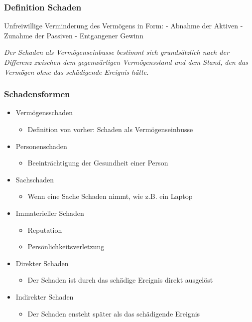 \hypertarget{definition-schaden}{%
\subsubsection{Definition Schaden}\label{definition-schaden}}

Unfreiwillige Verminderung des Vermögens in Form: - Abnahme der Aktiven
- Zunahme der Passiven - Entgangener Gewinn

\emph{Der Schaden als Vermögenseinbusse bestimmt sich grundsätzlich nach
der Differenz zwischen dem gegenwärtigen Vermögensstand und dem Stand,
den das Vermögen ohne das schädigende Ereignis hätte.}

\hypertarget{schadensformen}{%
\subsubsection{Schadensformen}\label{schadensformen}}

\begin{itemize}
\tightlist
\item
  Vermögensschaden

  \begin{itemize}
  \tightlist
  \item
    Definition von vorher: Schaden als Vermögenseinbusse
  \end{itemize}
\item
  Personenschaden

  \begin{itemize}
  \tightlist
  \item
    Beeinträchtigung der Gesundheit einer Person
  \end{itemize}
\item
  Sachschaden

  \begin{itemize}
  \tightlist
  \item
    Wenn eine Sache Schaden nimmt, wie z.B. ein Laptop
  \end{itemize}
\item
  Immaterieller Schaden

  \begin{itemize}
  \tightlist
  \item
    Reputation
  \item
    Persönlichkeitsverletzung
  \end{itemize}
\item
  Direkter Schaden

  \begin{itemize}
  \tightlist
  \item
    Der Schaden ist durch das schädige Ereignis direkt ausgelöst
  \end{itemize}
\item
  Indirekter Schaden

  \begin{itemize}
  \tightlist
  \item
    Der Schaden ensteht später als das schädigende Ereignis
  \end{itemize}
\end{itemize}

